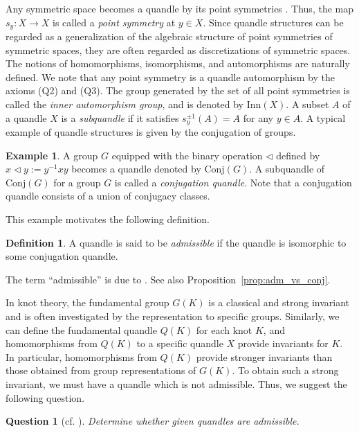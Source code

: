 \documentclass[dvipdfmx,12pt]{amsart}
\theoremstyle{plain}
\newtheorem{ques}[thm]{Question}
\theoremstyle{definition}
\newtheorem{dfn}[thm]{Definition}
\newtheorem{ex}[thm]{Example}
\newcommand{\qop}{\triangleleft}
\newcommand{\Conj}{\mathrm{Conj}}
\newcommand{\Inn}{\mathrm{Inn}}
\begin{document}
Any symmetric space becomes a quandle by its point symmetries \cite{Loos-1969-SymmetricSpacesGeneralTheorya,Joyce-1982-ClassifyingInvariantKnotsKnota}.
Thus, the map $s_y: X \to X$ is called a \emph{point symmetry} at $y \in X$.
Since quandle structures can be regarded as a generalization of the algebraic structure of point symmetries of symmetric spaces,
they are often regarded as discretizations of symmetric spaces.
The notions of homomorphisms, isomorphisms, and automorphisms are naturally defined.
We note that any point symmetry is a quandle automorphism by the axioms (Q2) and (Q3).
The group generated by the set of all point symmetries is called the \emph{inner automorphism group}, and is denoted by $\Inn(X)$. 
A subset $A$ of a quandle $X$ is a \emph{subquandle} if it satisfies $s_y^{\pm 1}(A) = A$ for any $y \in A$.
A typical example of quandle structures is given by the conjugation of groups.
\begin{ex}\label{ex:conj}
  A group $G$ equipped with the binary operation $\qop$ defined by $x \qop y:=y^{-1} x y$ becomes a quandle denoted by $\Conj(G)$.
  A subquandle of $\Conj(G)$ for a group $G$ is called a \emph{conjugation quandle}.
  Note that a conjugation quandle consists of a union of conjugacy classes.
\end{ex}
This example motivates the following definition.
\begin{dfn}\label{def:admissible}
A quandle is said to be \emph{admissible} if the quandle is isomorphic to some conjugation quandle.
\end{dfn}
The term ``admissible'' is due to \cite{Kamada-2005-EnvelopingMonoidalQuandlesa}. See also Proposition~\ref{prop:adm_vs_conj}.

In knot theory, the fundamental group $G(K)$ is a classical and strong invariant and is often investigated by the representation to specific groups.
Similarly, we can define the fundamental quandle $Q(K)$ for each knot $K$, and homomorphisms from $Q(K)$ to a specific quandle $X$ provide invariants for $K$.
In particular, homomorphisms from $Q(K)$ provide stronger invariants than those  obtained from group representations of $G(K)$.
To obtain such a strong invariant, we must have a quandle which is not admissible.
Thus, we suggest the following question.

\begin{ques}[cf. {\cite[Question 3.1]{Bardakov-2017-AutomorphismGroupsQuandlesArising}}]\label{quaestion}
  Determine whether given quandles are admissible.
\end{ques}
\end{document}
